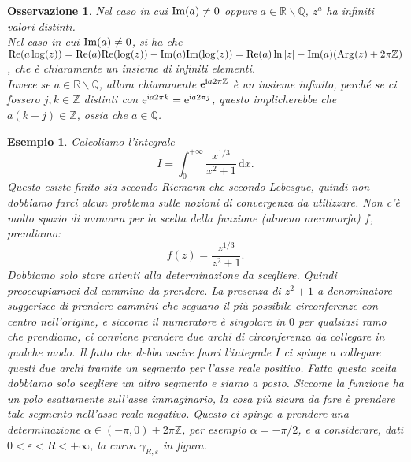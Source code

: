 \documentclass[11pt]{book}
\theoremstyle{Definizione}
\theoremstyle{TeoremaProposizioneLemmaCorollarioCongettura}
\theoremstyle{OsservazioneNotaEsempio}
\newtheorem{myobs}{Osservazione}[section]
\newtheorem{myes}{Esempio}[section]
\newcommand{\R}{\mathbb{R}}
\newcommand{\Z}{\mathbb{Z}}
\newcommand{\Q}{\mathbb{Q}}
\newcommand{\tolto}{\smallsetminus}
\renewcommand{\Re}{\textup{Re}}
\renewcommand{\Im}{\textup{Im}}
\newcommand{\Arg}[1][]{\textup{Arg}_{#1}}
\renewcommand{\i}{\textup{i}}
\newcommand{\e}{\textup{e}}
\renewcommand{\d}{\mathrm{d}}
\newcommand{\dx}{\,\d x}
\begin{document}
\begin{myobs}
Nel caso in cui $\Im(a) \neq 0$ oppure $a\in \R \tolto \Q$, $z^a$ ha infiniti valori distinti.\\
Nel caso in cui $\Im(a) \neq 0$, si ha che $\Re(a \log(z)) = \Re(a)\Re(\log(z)) -\Im(a)\Im(\log(z)) = \Re(a)\ln|z|-\Im(a)(\Arg(z)+2\pi\Z)$, che è chiaramente un insieme di infiniti elementi.\\
Invece se $a\in \R \tolto \Q$, allora chiaramente $\e^{\i a 2\pi \Z}$ è un insieme infinito,  perché se ci fossero $j,k\in \Z$ distinti con $\e^{\i a 2\pi k} = \e^{\i a 2\pi j}$, questo implicherebbe che $a(k-j)\in \Z$, ossia che $a\in \Q$.
\end{myobs}
\begin{myes}
Calcoliamo l'integrale
$$
I = \int_{0}^{+\infty} \frac{x^{1/3}}{x^2+1}\dx.
$$
Questo esiste finito sia secondo Riemann che secondo Lebesgue, quindi non dobbiamo farci alcun problema sulle nozioni di convergenza da utilizzare. Non c'è molto spazio di manovra per la scelta della funzione (almeno meromorfa) $f$, prendiamo:
$$
f(z) = \frac{z^{1/3}}{z^2+1}.
$$
Dobbiamo solo stare attenti alla determinazione da scegliere. Quindi preoccupiamoci del cammino da prendere. La presenza di $z^2+1$ a denominatore suggerisce di prendere cammini che seguano il più possibile circonferenze con centro nell'origine, e siccome il numeratore è singolare in $0$ per qualsiasi ramo che prendiamo, ci conviene prendere due archi di circonferenza da collegare in qualche modo. Il fatto che debba uscire fuori l'integrale $I$ ci spinge a collegare questi due archi tramite un segmento per l'asse reale positivo. Fatta questa scelta dobbiamo solo scegliere un altro segmento e siamo a posto. Siccome la funzione ha un polo esattamente sull'asse immaginario, la cosa più sicura da fare è prendere tale segmento nell'asse reale negativo. Questo ci spinge a prendere una determinazione $\alpha\in (-\pi,0)+2\pi\Z$, per esempio $\alpha = -\pi/2$, e a considerare, dati $0 < \varepsilon < R < +\infty$, la curva $\gamma_{R,\varepsilon}$ in figura.
\begin{center}
\end{center}
\end{myes}
\end{document}

